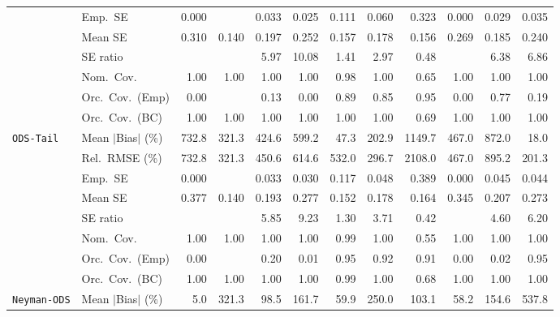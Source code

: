 \begin{landscape}
\begin{longtable}{llrrrrrrrrrr}
 & Emp.\ SE & 0.000 &  & 0.033 & 0.025 & 0.111 & 0.060 & 0.323 & 0.000 & 0.029 & 0.035 \\
 & Mean SE & 0.310 & 0.140 & 0.197 & 0.252 & 0.157 & 0.178 & 0.156 & 0.269 & 0.185 & 0.240 \\
 & SE ratio &  &  & 5.97 & 10.08 & \cellcolor{rankone}1.41 & \cellcolor{rankthree}2.97 & \cellcolor{ranktwo}0.48 &  & 6.38 & 6.86 \\
 & Nom.\ Cov. & \cellcolor{ranktwo}1.00 & \cellcolor{rankthree}1.00 & 1.00 & 1.00 & \cellcolor{rankone}0.98 & 1.00 & 0.65 & 1.00 & 1.00 & 1.00 \\
 & Orc.\ Cov.\ (Emp) & 0.00 &  & 0.13 & 0.00 & \cellcolor{ranktwo}0.89 & \cellcolor{rankthree}0.85 & \cellcolor{rankone}0.95 & 0.00 & 0.77 & 0.19 \\
 & Orc.\ Cov.\ (BC) & \cellcolor{ranktwo}1.00 & \cellcolor{rankthree}1.00 & 1.00 & 1.00 & \cellcolor{rankone}1.00 & 1.00 & 0.69 & 1.00 & 1.00 & 1.00 \\
\addlinespace[2pt]
\quad \texttt{ODS-Tail} & Mean $|$Bias$|$ (\%) & 732.8 & 321.3 & 424.6 & 599.2 & \cellcolor{ranktwo}47.3 & \cellcolor{rankthree}202.9 & 1149.7 & 467.0 & 872.0 & \cellcolor{rankone}18.0 \\
 & Rel.\ RMSE (\%) & 732.8 & \cellcolor{rankthree}321.3 & 450.6 & 614.6 & 532.0 & \cellcolor{ranktwo}296.7 & 2108.0 & 467.0 & 895.2 & \cellcolor{rankone}201.3 \\
 & Emp.\ SE & 0.000 &  & 0.033 & 0.030 & 0.117 & 0.048 & 0.389 & 0.000 & 0.045 & 0.044 \\
 & Mean SE & 0.377 & 0.140 & 0.193 & 0.277 & 0.152 & 0.178 & 0.164 & 0.345 & 0.207 & 0.273 \\
 & SE ratio &  &  & 5.85 & 9.23 & \cellcolor{rankone}1.30 & \cellcolor{rankthree}3.71 & \cellcolor{ranktwo}0.42 &  & 4.60 & 6.20 \\
 & Nom.\ Cov. & \cellcolor{ranktwo}1.00 & \cellcolor{rankthree}1.00 & 1.00 & 1.00 & \cellcolor{rankone}0.99 & 1.00 & 0.55 & 1.00 & 1.00 & 1.00 \\
 & Orc.\ Cov.\ (Emp) & 0.00 &  & 0.20 & 0.01 & \cellcolor{rankone}0.95 & \cellcolor{rankthree}0.92 & 0.91 & 0.00 & 0.02 & \cellcolor{ranktwo}0.95 \\
 & Orc.\ Cov.\ (BC) & \cellcolor{ranktwo}1.00 & \cellcolor{rankthree}1.00 & 1.00 & 1.00 & \cellcolor{rankone}0.99 & 1.00 & 0.68 & 1.00 & 1.00 & 1.00 \\
\addlinespace[2pt]
\quad \texttt{Neyman-ODS} & Mean $|$Bias$|$ (\%) & \cellcolor{rankone}5.0 & 321.3 & 98.5 & 161.7 & \cellcolor{rankthree}59.9 & 250.0 & 103.1 & \cellcolor{ranktwo}58.2 & 154.6 & 537.8 \\

\end{longtable}
\end{landscape}

